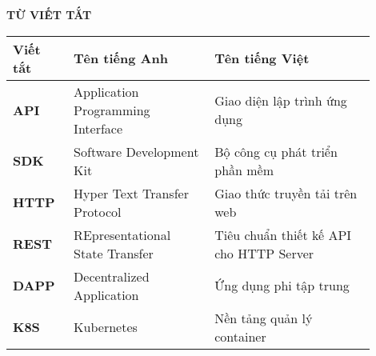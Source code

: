 \documentclass[../DoAn.tex]{subfiles}
\begin{document}
\begin{center}
	{\textbf{TỪ VIẾT TẮT}}\\
\end{center}
\vspace{1cm}

\begin{longtable}{p{0.15\linewidth} p{0.35\linewidth} p{0.4\linewidth}}
	\hline
	\textbf{Viết tắt} & \textbf{Tên tiếng Anh}            & \textbf{Tên tiếng Việt}                 \\ \hline
	\textbf{API}      & Application Programming Interface & Giao diện lập trình ứng dụng            \\
	\textbf{SDK}      & Software Development Kit          & Bộ công cụ phát triển phần mềm          \\
	\textbf{HTTP}     & Hyper Text Transfer Protocol      & Giao thức truyền tải trên web           \\
	\textbf{REST}     & REpresentational State Transfer   & Tiêu chuẩn thiết kế API cho HTTP Server \\
	\textbf{DAPP}     & Decentralized Application         & Ứng dụng phi tập trung                  \\
	\textbf{K8S}      & Kubernetes                        & Nền tảng quản lý container              \\

	\hline
\end{longtable}
\end{document}
